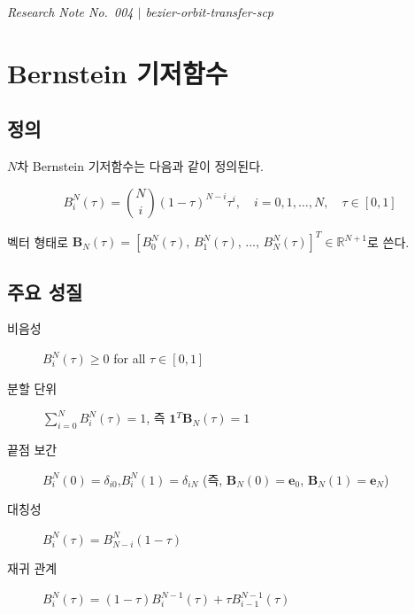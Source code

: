 \documentclass[11pt]{article}
\begin{document}
\drawborder
\thispagestyle{firstpage}


{\normalsize\textit{Research Note No.~004 $|$ bezier-orbit-transfer-scp}}\par\medskip

\def\lighterdate{March 12, 2026}


\begin{abstract}
본 보고서는 베지어 곡선 기반 궤적최적화의 핵심 수학적 도구인
Bernstein 기저함수, 미분 행렬, 적분 행렬, Gram 행렬을 체계적으로 유도하고 정리한다.
특히 \cite{report003}에서 채택한 추진 가속도 베지어 성형 방식에서
위치·속도가 제어점의 선형 함수로 표현되는 구조를 행렬 형식으로 명시적으로 도출한다.
이 결과는 이후 경계조건 인코딩, 제약조건 처리, SCP 정식화의 기반이 된다.
\end{abstract}

\section{Bernstein 기저함수}

\subsection{정의}

$N$차 Bernstein 기저함수는 다음과 같이 정의된다.

\begin{equation}
  B_i^N(\tau) = \binom{N}{i}(1-\tau)^{N-i}\tau^i, \quad i = 0, 1, \ldots, N,\quad \tau \in [0,1]
  \label{eq:bernstein}
\end{equation}

벡터 형태로 $\mathbf{B}_N(\tau) = [B_0^N(\tau),\, B_1^N(\tau),\, \ldots,\, B_N^N(\tau)]^T \in \mathbb{R}^{N+1}$로 쓴다.

\subsection{주요 성질}

\begin{description}
  \item[비음성] $B_i^N(\tau) \geq 0$ for all $\tau \in [0,1]$
  \item[분할 단위] $\sum_{i=0}^N B_i^N(\tau) = 1$, 즉 $\mathbf{1}^T \mathbf{B}_N(\tau) = 1$
  \item[끝점 보간] $B_i^N(0) = \delta_{i0}$,\quad $B_i^N(1) = \delta_{iN}$
        (즉, $\mathbf{B}_N(0) = \mathbf{e}_0$, $\mathbf{B}_N(1) = \mathbf{e}_N$)
  \item[대칭성] $B_i^N(\tau) = B_{N-i}^N(1-\tau)$
  \item[재귀 관계] $B_i^N(\tau) = (1-\tau)B_i^{N-1}(\tau) + \tau B_{i-1}^{N-1}(\tau)$
\end{description}
\end{document}
